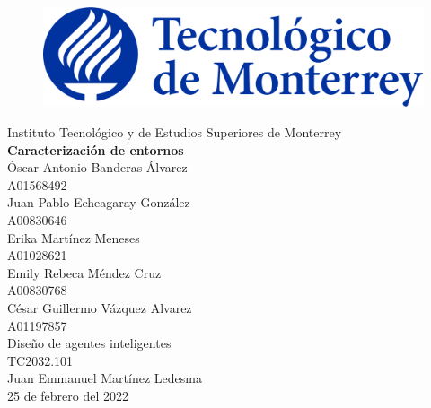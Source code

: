 \documentclass{article}
\begin{document}
    \begin{titlepage}
        \begin{center}
            \begin{figure}
                \centering
                \includegraphics[scale=0.13]{logo_itesm.png}\\ %
            \end{figure}
        \vspace{5cm}
        \LARGE{Instituto Tecnológico y de Estudios Superiores de Monterrey}\\
        \fontsize{12}{14}\selectfont
        \vspace{1cm}
        \textbf{Caracterización de entornos}\\ %
        \vspace{0.7cm}
        Óscar Antonio Banderas Álvarez \\
        \vspace{0.2cm}
        A01568492 \\
        \vspace{0.2cm}
        Juan Pablo Echeagaray González\\ %
        \vspace{0.2cm}
        A00830646 \\ %
        \vspace{0.2cm}
        Erika Martínez Meneses \\
        \vspace{0.2cm}
        A01028621 \\
        \vspace{0.2cm}
        Emily Rebeca Méndez Cruz\\
        \vspace{0.2cm}
        A00830768 \\
        \vspace{0.2cm}
        César Guillermo Vázquez Alvarez \\
        \vspace{0.2cm}
        A01197857 \\
        \vspace{0.7cm}
        Diseño de agentes inteligentes\\ %
        \vspace{0.2cm}
        TC2032.101\\ %
        \vspace{0.2cm}
        Juan Emmanuel Martínez Ledesma \\ %
        \vspace{0.7cm}
        25 de febrero del 2022\\ %
        \end{center}
    \end{titlepage}
\end{document}
